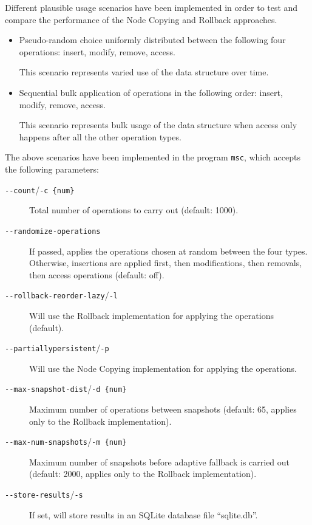 Different plausible usage scenarios have been implemented in order to test and
compare the performance of the Node Copying and Rollback approaches.

\begin{itemize}

  \item Pseudo-random choice uniformly distributed between the following four
  operations: insert, modify, remove, access.
  
  This scenario represents varied use of the data structure over time.

  \item Sequential bulk application of operations in the following order:
  insert, modify, remove, access.
  
  This scenario represents bulk usage of the data structure when access only
  happens after all the other operation types.

\end{itemize}

The above scenarios have been implemented in the program \texttt{msc}, which
accepts the following parameters:

\begin{description}

  \item[\texttt{-\@{}-count}/\texttt{-c \{num\}}] Total number of operations to carry
  out (default: 1000).

  \item[\texttt{-\@{}-randomize-operations}] If passed, applies the operations
  chosen at random between the four types. Otherwise, insertions are applied
  first, then modifications, then removals, then access operations (default:
  off).

  \item[\texttt{-\@{}-rollback-reorder-lazy}/\texttt{-l}] Will use the Rollback
  implementation for applying the operations (default).

  \item[\texttt{-\@{}-partiallypersistent}/\texttt{-p}] Will use the Node
  Copying implementation for applying the operations.

  \item[\texttt{-\@{}-max-snapshot-dist}/\texttt{-d \{num\}}] Maximum number of
  operations between snapshots (default: 65, applies only to the Rollback
  implementation).

  \item[\texttt{-\@{}-max-num-snapshots}/\texttt{-m \{num\}}] Maximum number of
  snapshots before adaptive fallback is carried out (default: 2000, applies only to the Rollback
  implementation).

  \item[\texttt{-\@{}-store-results}/\texttt{-s}] If set, will store results in
  an SQLite database file ``sqlite.db''.

\end{description}

